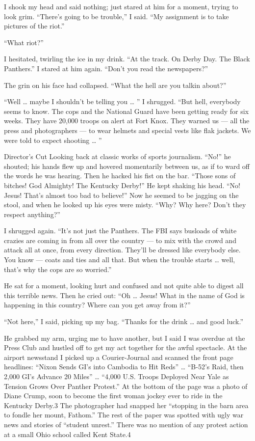 \documentclass[10pt,a4paper]{article}
\begin{document}
I shook my head and said nothing; just stared at him for a moment, trying to look grim. “There’s going to be trouble,” I said. “My assignment is to take pictures of the riot.”

“What riot?”

I hesitated, twirling the ice in my drink. “At the track. On Derby Day. The Black Panthers.” I stared at him again. “Don’t you read the newspapers?”

The grin on his face had collapsed. “What the hell are you talkin about?”

“Well … maybe I shouldn’t be telling you … ” I shrugged. “But hell, everybody seems to know. The cops and the National Guard have been getting ready for six weeks. They have 20,000 troops on alert at Fort Knox. They warned us — all the press and photographers — to wear helmets and special vests like flak jackets. We were told to expect shooting … ”

Director's Cut
Looking back at classic works of sports journalism.
“No!” he shouted; his hands flew up and hovered momentarily between us, as if to ward off the words he was hearing. Then he hacked his fist on the bar. “Those sons of bitches! God Almighty! The Kentucky Derby!” He kept shaking his head. “No! Jesus! That’s almost too bad to believe!” Now he seemed to be jagging on the stool, and when he looked up his eyes were misty. “Why? Why here? Don’t they respect anything?”

I shrugged again. “It’s not just the Panthers. The FBI says busloads of white crazies are coming in from all over the country — to mix with the crowd and attack all at once, from every direction. They’ll be dressed like everybody else. You know — coats and ties and all that. But when the trouble starts … well, that’s why the cops are so worried.”

He sat for a moment, looking hurt and confused and not quite able to digest all this terrible news. Then he cried out: “Oh … Jesus! What in the name of God is happening in this country? Where can you get away from it?”

“Not here,” I said, picking up my bag. “Thanks for the drink … and good luck.”

He grabbed my arm, urging me to have another, but I said I was overdue at the Press Club and hustled off to get my act together for the awful spectacle. At the airport newsstand I picked up a Courier-Journal and scanned the front page headlines: “Nixon Sends GI’s into Cambodia to Hit Reds” … “B-52’s Raid, then 2,000 GI’s Advance 20 Miles” … “4,000 U.S. Troops Deployed Near Yale as Tension Grows Over Panther Protest.” At the bottom of the page was a photo of Diane Crump, soon to become the first woman jockey ever to ride in the Kentucky Derby.3 The photographer had snapped her “stopping in the barn area to fondle her mount, Fathom.” The rest of the paper was spotted with ugly war news and stories of “student unrest.” There was no mention of any protest action at a small Ohio school called Kent State.4
\end{document}
